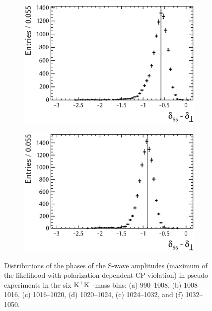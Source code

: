 \begin{figure}[tbp]
  \vspace*{0.02\textwidth}
  \begin{subfigure}{0.49\textwidth}
    \includegraphics[width=\textwidth]{graphics/results/parDist_polarDep_ASOddPhase_bin4}
    \caption{}
  \end{subfigure}
  \hfill%
  \begin{subfigure}{0.49\textwidth}
    \includegraphics[width=\textwidth]{graphics/results/parDist_polarDep_ASOddPhase_bin5}
    \caption{}
  \end{subfigure}

  \caption{Distributions of the phases of the S-wave amplitudes (maximum of the likelihood with polarization-dependent CP violation)
           in pseudo experiments in the six $\text{K}^\text{+}\text{K}^\text{--}$-mass bins:
           (a) 990--1008\unitsp\MeV, (b) 1008--1016\unitsp\MeV, (c) 1016--1020\unitsp\MeV,
           (d) 1020--1024\unitsp\MeV, (c) 1024--1032\unitsp\MeV, and (f) 1032--1050\unitsp\MeV.}
  \label{fig:parDists_SWavePhases}
\end{figure}

